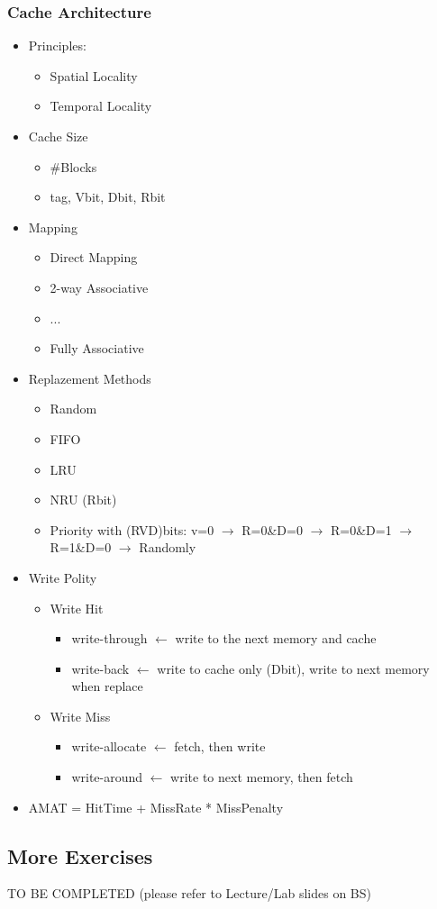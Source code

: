 \documentclass{article}
\begin{document}
\subsubsection{Cache Architecture}
\begin{itemize}
    \item Principles:
        \begin{itemize}
            \item Spatial Locality
            \item Temporal Locality
        \end{itemize}
    \item Cache Size
        \begin{itemize}
            \item \#Blocks
            \item tag, Vbit, Dbit, Rbit
        \end{itemize}
    \item Mapping
        \begin{itemize}
            \item Direct Mapping
            \item 2-way Associative
            \item ...
            \item Fully Associative 
        \end{itemize}
    \item Replazement Methods
        \begin{itemize}
            \item Random
            \item FIFO
            \item LRU
            \item NRU (Rbit)
            \item Priority with (RVD)bits: v=0 $\rightarrow$ R=0\&D=0 $\rightarrow$ R=0\&D=1 $\rightarrow$ R=1\&D=0 $\rightarrow$ Randomly
        \end{itemize}
    \item Write Polity  
        \begin{itemize}
            \item Write Hit
                \begin{itemize}
                    \item write-through $\leftarrow$ write to the next memory and cache
                    \item write-back $\leftarrow$ write to cache only (Dbit), write to next memory when replace
                \end{itemize}
            \item Write Miss
                \begin{itemize}
                    \item write-allocate $\leftarrow$ fetch, then write
                    \item write-around $\leftarrow$ write to next memory, then fetch
                \end{itemize}
        \end{itemize}
    \item AMAT = HitTime + MissRate * MissPenalty
\end{itemize}

\subsection{More Exercises}
TO BE COMPLETED (please refer to Lecture/Lab slides on BS)


 

 
\end{document}
